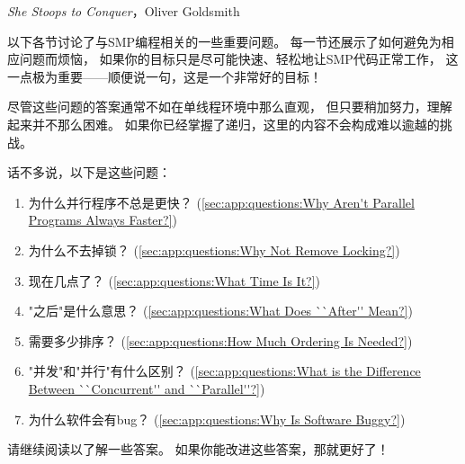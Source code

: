 
%
	 {\emph{She Stoops to Conquer}，Oliver Goldsmith}

以下各节讨论了与SMP编程相关的一些重要问题。
每一节还展示了如何避免为相应问题而烦恼，
如果你的目标只是尽可能快速、轻松地让SMP代码正常工作，
这一点极为重要——顺便说一句，这是一个非常好的目标！

尽管这些问题的答案通常不如在单线程环境中那么直观，
但只要稍加努力，理解起来并不那么困难。
如果你已经掌握了递归，这里的内容不会构成难以逾越的挑战。

话不多说，以下是这些问题：

\begin{enumerate}
\item	为什么并行程序不总是更快？
	(\cref{sec:app:questions:Why Aren't Parallel Programs Always Faster?})
\item	为什么不去掉锁？
	(\cref{sec:app:questions:Why Not Remove Locking?})
\item	现在几点了？
	(\cref{sec:app:questions:What Time Is It?})
\item	"之后"是什么意思？
	(\cref{sec:app:questions:What Does ``After'' Mean?})
\item	需要多少排序？
	(\cref{sec:app:questions:How Much Ordering Is Needed?})
\item	"并发"和"并行"有什么区别？
	(\cref{sec:app:questions:What is the Difference Between ``Concurrent'' and ``Parallel''?})
\item	为什么软件会有bug？
	(\cref{sec:app:questions:Why Is Software Buggy?})
\end{enumerate}

请继续阅读以了解一些答案。
如果你能改进这些答案，那就更好了！










